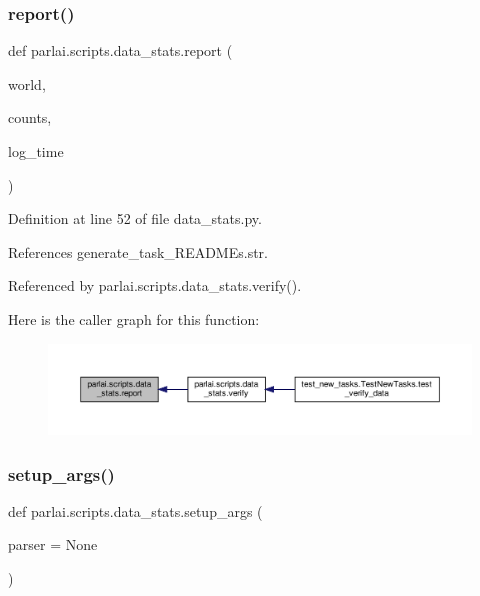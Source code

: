 \subsubsection{\texorpdfstring{report()}{report()}}
{\footnotesize\ttfamily def parlai.\+scripts.\+data\+\_\+stats.\+report (\begin{DoxyParamCaption}\item[{}]{world,  }\item[{}]{counts,  }\item[{}]{log\+\_\+time }\end{DoxyParamCaption})}



Definition at line 52 of file data\+\_\+stats.\+py.



References generate\+\_\+task\+\_\+\+R\+E\+A\+D\+M\+Es.\+str.



Referenced by parlai.\+scripts.\+data\+\_\+stats.\+verify().

Here is the caller graph for this function\+:
\nopagebreak
\begin{figure}[H]
\begin{center}
\leavevmode
\includegraphics[width=350pt]{namespaceparlai_1_1scripts_1_1data__stats_a8cc2308cc735ce6cf029d4c02fea5a21_icgraph}
\end{center}
\end{figure}
\mbox{\label{namespaceparlai_1_1scripts_1_1data__stats_add47fb96d75895f4c21d9e310cb1df40}} 
\subsubsection{\texorpdfstring{setup\+\_\+args()}{setup\_args()}}
{\footnotesize\ttfamily def parlai.\+scripts.\+data\+\_\+stats.\+setup\+\_\+args (\begin{DoxyParamCaption}\item[{}]{parser = {\ttfamily None} }\end{DoxyParamCaption})}



